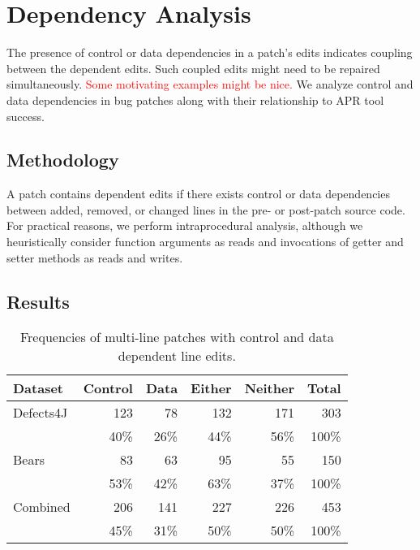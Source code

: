 \documentclass[sigconf, timestamp-false, anonymous=true]{acmart}
\newcommand\todo[1]{\textcolor{red}{#1}}
\begin{document}




\section{Dependency Analysis}


The presence of control or data dependencies in a patch's edits 
indicates coupling between the dependent edits.
Such coupled edits might need to be repaired simultaneously.
\todo{Some motivating examples might be nice.}
We analyze control and data dependencies in bug patches along 
with their relationship to APR tool success.

\subsection{Methodology}

A patch contains dependent edits if there exists control or data dependencies 
between added, removed, or changed lines in the pre- or post-patch
source code. For practical reasons, we perform intraprocedural analysis, 
although we heuristically consider function arguments as reads 
and invocations of getter and setter methods as reads and writes.

\subsection{Results}

\begin{table}
{\begin{center}
	\begin{tabular}{l | rrrr | r}
		\toprule
		Dataset & Control & Data & Either & Neither & Total \\
		\midrule
		Defects4J & 123 & 78 & 132 & 171 & 303 \\
		& 40\% & 26\% & 44\% & 56\% & 100\% \\
		Bears & 83 & 63 & 95 & 55 & 150 \\
		& 53\% & 42\% & 63\% & 37\% & 100\% \\
		\midrule
		Combined & 206 & 141 & 227 & 226 & 453 \\
		& 45\% & 31\% & 50\% & 50\% & 100\% \\
		\bottomrule
	\end{tabular}
 \end{center}
}
	\caption{Frequencies of multi-line patches with control and data dependent line edits.}
	\label{tab:dependency}
\end{table}
\end{document}
